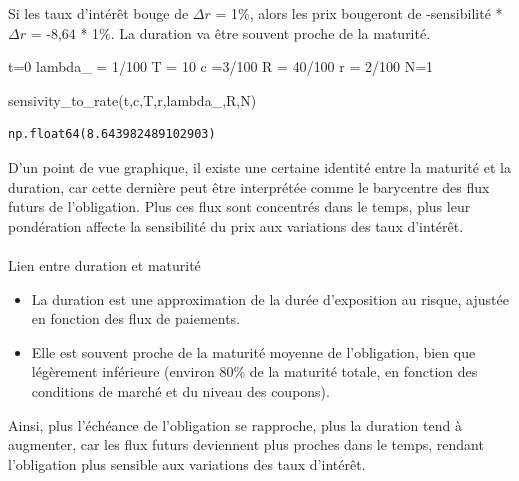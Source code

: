 \documentclass[
  letterpaper,
  DIV=11,
  numbers=noendperiod]{scrartcl}
\makeatletter
\let\oldparagraph\paragraph
\renewcommand{\paragraph}{
    \@ifstar
      \xxxParagraphStar
      \xxxParagraphNoStar
  }
\newcommand{\xxxParagraphStar}[1]{\oldparagraph*{#1}\mbox{}}
\newcommand{\xxxParagraphNoStar}[1]{\oldparagraph{#1}\mbox{}}
\newenvironment{Shaded}{\begin{snugshade}}{\end{snugshade}}
\newcommand{\DecValTok}[1]{\textcolor[rgb]{0.68,0.00,0.00}{#1}}
\newcommand{\NormalTok}[1]{\textcolor[rgb]{0.00,0.23,0.31}{#1}}
\newcommand{\OperatorTok}[1]{\textcolor[rgb]{0.37,0.37,0.37}{#1}}
\providecommand{\tightlist}{%
  \setlength{\itemsep}{0pt}\setlength{\parskip}{0pt}}\usepackage{longtable,booktabs,array}
\makeatother
\begin{document}
Si les taux d'intérêt bouge de \(\Delta r\) = 1\%, alors les prix
bougeront de -sensibilité * \(\Delta r\) = -8,64 * 1\%. La duration va
être souvent proche de la maturité.

\begin{Shaded}
\begin{Highlighting}[]
\NormalTok{t}\OperatorTok{=}\DecValTok{0}
\NormalTok{lambda\_ }\OperatorTok{=} \DecValTok{1}\OperatorTok{/}\DecValTok{100}
\NormalTok{T }\OperatorTok{=} \DecValTok{10}
\NormalTok{c }\OperatorTok{=}\DecValTok{3}\OperatorTok{/}\DecValTok{100}
\NormalTok{R }\OperatorTok{=} \DecValTok{40}\OperatorTok{/}\DecValTok{100}
\NormalTok{r }\OperatorTok{=} \DecValTok{2}\OperatorTok{/}\DecValTok{100}
\NormalTok{N}\OperatorTok{=}\DecValTok{1}

\NormalTok{sensivity\_to\_rate(t,c,T,r,lambda\_,R,N)}
\end{Highlighting}
\end{Shaded}

\begin{verbatim}
np.float64(8.643982489102903)
\end{verbatim}

D'un point de vue graphique, il existe une certaine identité entre la
maturité et la duration, car cette dernière peut être interprétée comme
le barycentre des flux futurs de l'obligation. Plus ces flux sont
concentrés dans le temps, plus leur pondération affecte la sensibilité
du prix aux variations des taux d'intérêt.

\paragraph{Lien entre duration et
maturité}\label{lien-entre-duration-et-maturituxe9}

\begin{itemize}
\tightlist
\item
  La duration est une approximation de la durée d'exposition au risque,
  ajustée en fonction des flux de paiements.\\
\item
  Elle est souvent proche de la maturité moyenne de l'obligation, bien
  que légèrement inférieure (environ 80\% de la maturité totale, en
  fonction des conditions de marché et du niveau des coupons).
\end{itemize}

Ainsi, plus l'échéance de l'obligation se rapproche, plus la duration
tend à augmenter, car les flux futurs deviennent plus proches dans le
temps, rendant l'obligation plus sensible aux variations des taux
d'intérêt.
\end{document}
